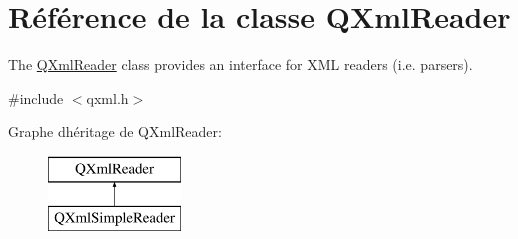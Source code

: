\hypertarget{class_q_xml_reader}{}\section{Référence de la classe Q\+Xml\+Reader}
\label{class_q_xml_reader}


The \hyperlink{class_q_xml_reader}{Q\+Xml\+Reader} class provides an interface for X\+M\+L readers (i.\+e. parsers).  




{\ttfamily \#include $<$qxml.\+h$>$}

Graphe d\textquotesingle{}héritage de Q\+Xml\+Reader\+:\begin{figure}[H]
\begin{center}
\leavevmode
\includegraphics[height=2.000000cm]{class_q_xml_reader}
\end{center}
\end{figure}
